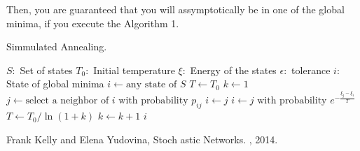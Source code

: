 Then, you are guaranteed that you will assymptotically be in one of the global minima, if you execute the Algorithm 1.

\begin{algorithm}
\caption{Simmulated Annealing.}\label{euclid}
\begin{algorithmic}[1]
\Require 
\Statex $S:$ Set of states
\Statex $\textit{T}_0:$ Initial temperature
\Statex $\xi:$ Energy of the states
\Statex $\epsilon:$ tolerance
\Ensure
\Statex $i:$ State of global minima
\State $i \gets \text{any state of }\textit{S}$
\State $T \gets \textit{T}_0$
\State $k \gets 1$
	\State $j \gets \text{select a neighbor of }\textit{i}\text{ with probability }\textit{p}_{ij}$
		\State $i \gets j$
	\Else 
		\State $i \gets j\text{ with probability }\textit{e}^{-\frac{\xi_j-\xi_i}{T}}$
	\EndIf
	\State $T \gets \textit{T}_0/\ln (1+k)$
	\State $k \gets k+1$
\EndWhile
\Return $i$
\EndProcedure
\end{algorithmic}
\end{algorithm}

\begin{thebibliography}{alpha}
	
	 Frank Kelly and Elena Yudovina,
	\newblock Stoch	astic Networks.
	, 2014.
	
\end{thebibliography}



